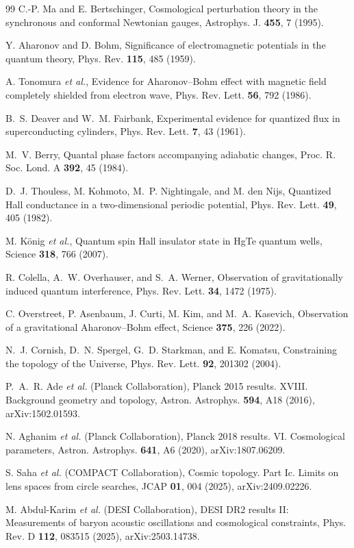 \documentclass[
  aps,
  prd,
  reprint,
  superscriptaddress,
  floatfix,
  nofootinbib,
  longbibliography
]{revtex4-2}
\theoremstyle{plain}
\theoremstyle{definition}
\theoremstyle{remark}
\begin{document}
\begin{thebibliography}{99}
C.-P. Ma and E. Bertschinger,
Cosmological perturbation theory in the synchronous and conformal Newtonian gauges,
Astrophys. J. \textbf{455}, 7 (1995).

Y. Aharonov and D. Bohm,
Significance of electromagnetic potentials in the quantum theory,
Phys. Rev. \textbf{115}, 485 (1959).

A. Tonomura \emph{et al.},
Evidence for Aharonov--Bohm effect with magnetic field completely shielded from electron wave,
Phys. Rev. Lett. \textbf{56}, 792 (1986).

B.~S. Deaver and W.~M. Fairbank,
Experimental evidence for quantized flux in superconducting cylinders,
Phys. Rev. Lett. \textbf{7}, 43 (1961).

M.~V. Berry,
Quantal phase factors accompanying adiabatic changes,
Proc. R. Soc. Lond. A \textbf{392}, 45 (1984).

D.~J. Thouless, M. Kohmoto, M.~P. Nightingale, and M. den Nijs,
Quantized Hall conductance in a two-dimensional periodic potential,
Phys. Rev. Lett. \textbf{49}, 405 (1982).

M. K\"onig \emph{et al.},
Quantum spin Hall insulator state in HgTe quantum wells,
Science \textbf{318}, 766 (2007).

R. Colella, A.~W. Overhauser, and S.~A. Werner,
Observation of gravitationally induced quantum interference,
Phys. Rev. Lett. \textbf{34}, 1472 (1975).

C. Overstreet, P. Asenbaum, J. Curti, M. Kim, and M.~A. Kasevich,
Observation of a gravitational Aharonov--Bohm effect,
Science \textbf{375}, 226 (2022).

N.~J. Cornish, D.~N. Spergel, G.~D. Starkman, and E. Komatsu,
Constraining the topology of the Universe,
Phys. Rev. Lett. \textbf{92}, 201302 (2004).

P.~A.~R. Ade \emph{et al.} (Planck Collaboration),
Planck 2015 results. XVIII. Background geometry and topology,
Astron. Astrophys. \textbf{594}, A18 (2016),
arXiv:1502.01593.

N. Aghanim \emph{et al.} (Planck Collaboration),
Planck 2018 results. VI. Cosmological parameters,
Astron. Astrophys. \textbf{641}, A6 (2020),
arXiv:1807.06209.

S. Saha \emph{et al.} (COMPACT Collaboration),
Cosmic topology. Part Ic. Limits on lens spaces from circle searches,
JCAP \textbf{01}, 004 (2025),
arXiv:2409.02226.

M. Abdul-Karim \emph{et al.} (DESI Collaboration),
DESI DR2 results II: Measurements of baryon acoustic oscillations and cosmological constraints,
Phys. Rev. D \textbf{112}, 083515 (2025),
arXiv:2503.14738.

\end{thebibliography}
\end{document}

